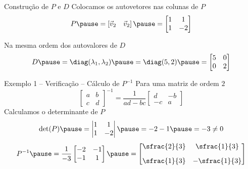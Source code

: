 \begin{resolution}{Construção de \(P\) e \(D\)}
  Colocamos os autovetores nas colunas de \(P\)
  \pause
  \[
    P
    \pause
    = \left[ \vec{v}_2 \quad \vec{v}_2 \right]
    \pause
    = \begin{bmatrix}
      1 &  1  \\
      1 & -2
    \end{bmatrix}
  \]

  \pause
  Na mesma ordem dos autovalores de \(D\)
  \pause
  \[
    D
    \pause
    = \diag(\lambda_1, \lambda_2)
    \pause
    = \diag(5, 2)
    \pause
    = \begin{bmatrix}
        5 & 0 \\
        0 & 2
      \end{bmatrix}
  \]
\end{resolution}

\begin{proofframe}{Exemplo 1 -- Verificação -- Cálculo de \(P^{-1}\)}
  Para uma matriz de ordem \(2\)
  \[
    \begin{bmatrix}
      a & b \\
      c & d
    \end{bmatrix}^{-1}
    =
    \frac{1}{ad-bc}
    \begin{bmatrix}
      d  & -b \\
      -c & a
    \end{bmatrix}
  \]
  \pause
  Calculamos o determinante de \(P\)
  \pause
  \[
    \det(P)
    \pause
    = \begin{vmatrix}
      1 &  1  \\
      1 & -2
    \end{vmatrix}
    \pause
    = -2 -1
    \pause
    = -3
    \neq 0
  \]
  \pause
  \[
    P^{-1}
    \pause
    = \frac{1}{-3}
    \begin{bmatrix}
      -2 & -1 \\
      -1 & 1
    \end{bmatrix}
    \pause
    =
    \begin{bmatrix}
      \sfrac{2}{3} &  \sfrac{1}{3}  \\[3mm]
      \sfrac{1}{3} & -\sfrac{1}{3}
    \end{bmatrix}
  \]
\end{proofframe}

